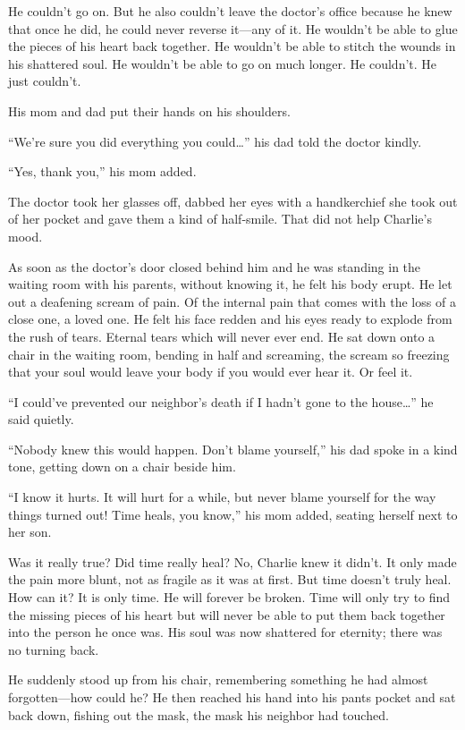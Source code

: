 He couldn't go on. But he also couldn't leave the doctor's office because he knew that once he did, he could never reverse it—any of it. He wouldn't be able to glue the pieces of his heart back together. He wouldn't be able to stitch the wounds in his shattered soul. He wouldn't be able to go on much longer. He couldn't. He just couldn't.

His mom and dad put their hands on his shoulders.

“We're sure you did everything you could…” his dad told the doctor kindly.

“Yes, thank you,” his mom added.

The doctor took her glasses off, dabbed her eyes with a handkerchief she took out of her pocket and gave them a kind of half-smile. That did not help Charlie's mood.

\bigskip

As soon as the doctor's door closed behind him and he was standing in the waiting room with his parents, without knowing it, he felt his body erupt. He let out a deafening scream of pain. Of the internal pain that comes with the loss of a close one, a loved one. He felt his face redden and his eyes ready to explode from the rush of tears. Eternal tears which will never ever end. He sat down onto a chair in the waiting room, bending in half and screaming, the scream so freezing that your soul would leave your body if you would ever hear it. Or feel it.

“I could've prevented our neighbor's death if I hadn't gone to the house…” he said quietly.

“Nobody knew this would happen. Don't blame yourself,” his dad spoke in a kind tone, getting down on a chair beside him.

“I know it hurts. It will hurt for a while, but never blame yourself for the way things turned out! Time heals, you know,” his mom added, seating herself next to her son.

Was it really true? Did time really heal? No, Charlie knew it didn't. It only made the pain more blunt, not as fragile as it was at first. But time doesn't truly heal. How can it? It is only time. He will forever be broken. Time will only try to find the missing pieces of his heart but will never be able to put them back together into the person he once was. His soul was now shattered for eternity; there was no turning back.

He suddenly stood up from his chair, remembering something he had almost forgotten—how could he? He then reached his hand into his pants pocket and sat back down, fishing out the mask, the mask his neighbor had touched.

